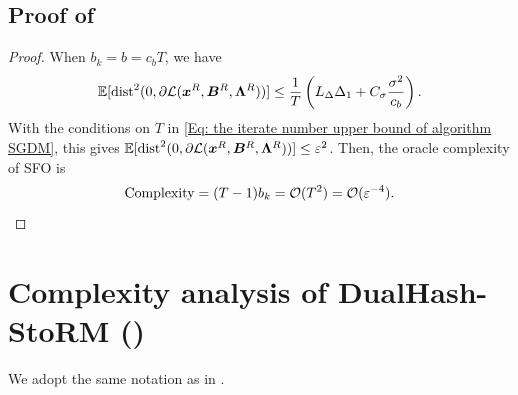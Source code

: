 \subsection{Proof of }
\label{Subsec: proof theorem SGDM}
\begin{proof}
    When $b_{k}= b = c_{b}T$, we have
    \[
        \mathbb{E}[\mathrm{dist}^{2}(0, \partial \mathcal{L}(\bm{x}^{R}, \bm{B}^{R}
        , \bm{\Lambda}^{R}))] \leq \frac{1}{T}\left( L_{\Delta}\Delta_{1}+ C_{\sigma}
        \frac{\sigma^{2}}{c_{b}}\right).
    \]
    With the conditions on $T$ in \eqref{Eq: the iterate number upper bound of algorithm SGDM},
    this gives
    $\mathbb{E}[\mathrm{dist}^{2}(0, \partial \mathcal{L}(\bm{x}^{R}, \bm{B}^{R}
    , \bm{\Lambda}^{R}))] \leq \varepsilon^{2}$. Then, the oracle complexity
    of SFO is
    \[
        \text{Complexity}= (T-1)b_{k}=\mathcal{O}(T^{2}) = \mathcal{O}(\varepsilon^{-4}).
    \]
\end{proof}

\section{Complexity analysis of DualHash-StoRM (\texorpdfstring{}{Algorithm 2})}
\label{Appendix: the complexity analysis of DualHash-StoRM}
We adopt the same notation as in . 

